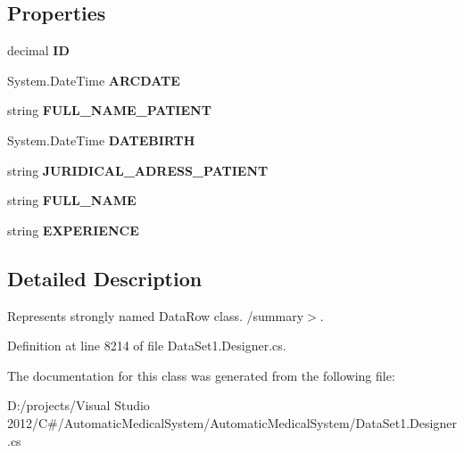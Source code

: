 \subsection*{Properties}
\begin{CompactItemize}
\item 
decimal \textbf{ID}\hspace{0.3cm}{\tt  [get, set]}\label{class_automatic_medical_system_1_1_data_set1_1_1_v_a_r_c_s_p_d_o_c_t_o_r_r_e_c_o_r_d_s_row_270e0787cd6b12cb0588f6fdbf81d16a}

\item 
System.DateTime \textbf{ARCDATE}\hspace{0.3cm}{\tt  [get, set]}\label{class_automatic_medical_system_1_1_data_set1_1_1_v_a_r_c_s_p_d_o_c_t_o_r_r_e_c_o_r_d_s_row_87f6c03541f1272d3bdaa6f2f3703928}

\item 
string \textbf{FULL\_\-NAME\_\-PATIENT}\hspace{0.3cm}{\tt  [get, set]}\label{class_automatic_medical_system_1_1_data_set1_1_1_v_a_r_c_s_p_d_o_c_t_o_r_r_e_c_o_r_d_s_row_4ed4f76a84ff7e594112fb5e58cfa8b9}

\item 
System.DateTime \textbf{DATEBIRTH}\hspace{0.3cm}{\tt  [get, set]}\label{class_automatic_medical_system_1_1_data_set1_1_1_v_a_r_c_s_p_d_o_c_t_o_r_r_e_c_o_r_d_s_row_601c171d2fbd3269a768462c06cfdb5c}

\item 
string \textbf{JURIDICAL\_\-ADRESS\_\-PATIENT}\hspace{0.3cm}{\tt  [get, set]}\label{class_automatic_medical_system_1_1_data_set1_1_1_v_a_r_c_s_p_d_o_c_t_o_r_r_e_c_o_r_d_s_row_0df68dd953ce7dc9e4b38e38a676ef1a}

\item 
string \textbf{FULL\_\-NAME}\hspace{0.3cm}{\tt  [get, set]}\label{class_automatic_medical_system_1_1_data_set1_1_1_v_a_r_c_s_p_d_o_c_t_o_r_r_e_c_o_r_d_s_row_dd6659f0fc462786c93316c398ae3ecf}

\item 
string \textbf{EXPERIENCE}\hspace{0.3cm}{\tt  [get, set]}\label{class_automatic_medical_system_1_1_data_set1_1_1_v_a_r_c_s_p_d_o_c_t_o_r_r_e_c_o_r_d_s_row_b36a7ee327f4d9be47801348b1079cd2}

\end{CompactItemize}


\subsection{Detailed Description}
Represents strongly named DataRow class. /summary$>$. 

Definition at line 8214 of file DataSet1.Designer.cs.

The documentation for this class was generated from the following file:\begin{CompactItemize}
\item 
D:/projects/Visual Studio 2012/C\#/AutomaticMedicalSystem/AutomaticMedicalSystem/DataSet1.Designer.cs\end{CompactItemize}

